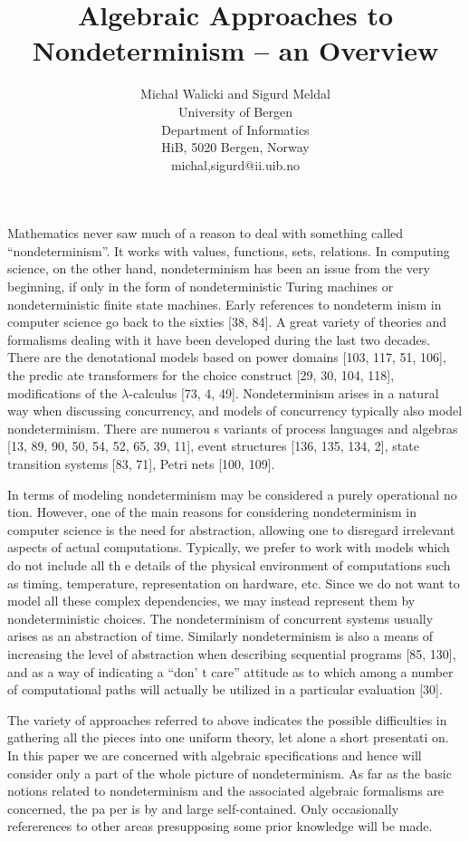 \documentclass[10pt]{article}
\title{Algebraic Approaches to Nondeterminism -- an Overview}
\author{Micha{\l} Walicki and Sigurd Meldal \\
University of Bergen \\
Department of Informatics\\
HiB, 5020 Bergen, Norway \\
{michal,sigurd}@ii.uib.no}
\begin{document}
\maketitle

Mathematics never saw much of a 
reason to deal with something called ``nondeterminism''.  
It works with values,
 functions, sets, relations. In computing science, on the other hand, 
nondeterminism has been an issue from the very beginning, if only in 
the form of nondeterministic Turing machines or nondeterministic 
finite state machines. Early references to nondeterm
inism in computer science go back to the sixties [38, 84].  A great 
variety of theories and formalisms dealing with it have been 
developed during the last two decades. There are the denotational 
models based on power domains [103, 117, 51, 106], the predic
ate transformers for the choice construct [29, 30, 104, 118], 
modifications of the $\lambda$-calculus [73, 4, 49]. Nondeterminism arises in 
a natural way when discussing concurrency, and models of concurrency 
typically also model nondeterminism.  There are numerou
s variants of process languages and algebras [13, 89, 90, 50, 54, 52, 
65, 39, 11], event structures [136, 135, 134, 2], state transition 
systems [83, 71], Petri nets [100, 109]. 

 In terms of modeling 
nondeterminism may be considered a purely operational no
tion. However, one of the main reasons for considering nondeterminism 
in computer science is the need for abstraction, allowing one to 
disregard irrelevant aspects of actual computations. Typically, we 
prefer to work with models which do not include all th
e details of the physical environment of computations such as timing, 
temperature, representation on hardware, etc. Since we do not want to 
model all these complex dependencies, we may instead represent them 
by nondeterministic choices. The nondeterminism 
of concurrent systems usually arises as an abstraction of time. 
Similarly nondeterminism is also a means of increasing the level of 
abstraction when describing sequential programs [85, 130], and as a 
way of indicating a ``don' t care''  attitude as to which among a 
number of computational 
paths will actually be utilized in a particular evaluation [30].

 The variety of approaches referred to above 
indicates the possible difficulties in gathering all the pieces into 
one uniform theory, let alone a short presentati
on. In this paper we are concerned with algebraic specifications and 
hence will consider only a part of the whole picture of 
nondeterminism. As far as the basic notions related to nondeterminism 
and the associated algebraic formalisms are concerned, the pa
per is by and large self-contained. Only occasionally refererences to 
other areas presupposing some prior knowledge will be made.
\end{document}
